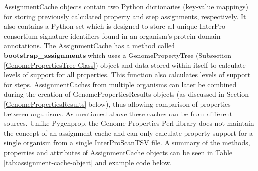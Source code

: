 AssignmentCache objects contain two Python dictionaries (key-value mappings) for storing previously calculated property and step assignments, respectively. It also contains a Python set which is designed to store all unique InterPro consortium signature identifiers found in an organism's protein domain annotations. The AssignmentCache has a method called \textbf{bootstrap\_assignments} which uses a GenomePropertyTree (Subsection \ref{GenomePropertiesTree-Class}) object and data stored within itself to calculate levels of support for all properties. This function also calculates levels of support for steps. AssignmentCaches from multiple organisms can later be combined during the creation of GenomePropertiesResults objects (as discussed in Section \ref{GenomePropertiesResults} below), thus allowing comparison of properties between organisms. As mentioned above these caches can be from different sources. Unlike Pygenprop, the Genome Properties Perl library does not maintain the concept of an assignment cache and can only calculate property support for a single organism from a single InterProScanTSV file. A summary of the methods, properties and attributes of AssignmentCache objects can be seen in Table \ref{tab:assignment-cache-object} and example code below.

